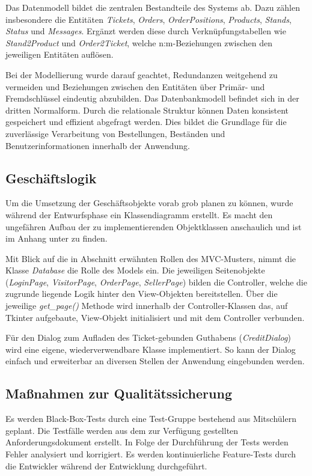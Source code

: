 Das Datenmodell bildet die zentralen Bestandteile des Systems ab. Dazu zählen insbesondere die Entitäten \emph{Tickets}, \emph{Orders}, \emph{OrderPositions},
\emph{Products}, \emph{Stands}, \emph{Status} und \emph{Messages}. Ergänzt werden diese durch Verknüpfungstabellen wie \emph{Stand2Product} und
\emph{Order2Ticket}, welche n:m-Beziehungen zwischen den jeweiligen Entitäten auflösen.

Bei der Modellierung wurde darauf geachtet, Redundanzen weitgehend zu vermeiden und Beziehungen zwischen den Entitäten über Primär- und Fremdschlüssel eindeutig abzubilden. Das
Datenbankmodell befindet sich in der dritten Normalform.  Durch die relationale Struktur können Daten konsistent gespeichert und effizient abgefragt werden. Dies bildet die
Grundlage für die zuverlässige Verarbeitung von Bestellungen, Beständen und Benutzerinformationen innerhalb der Anwendung.

\subsection{Geschäftslogik}
\label{sec:Geschaeftslogik}
Um die Umsetzung der Geschäftsobjekte vorab grob planen zu können, wurde während der Entwurfsphase ein Klassendiagramm erstellt. Es macht den ungefähren Aufbau der zu
implementierenden Objektklassen anschaulich und ist im Anhang unter  zu finden.

Mit Blick auf die in Abschnitt  erwähnten Rollen des \acs{MVC}-Musters, nimmt die Klasse \emph{Database} die Rolle des Models ein. Die jeweiligen
Seitenobjekte (\emph{LoginPage}, \emph{VisitorPage}, \emph{OrderPage}, \emph{SellerPage}) bilden die Controller, welche die zugrunde liegende Logik hinter den View-Objekten 
bereitstellen. Über die jeweilige \emph{get\_page()} Methode wird innerhalb der Controller-Klassen das, auf Tkinter aufgebaute, View-Objekt initialisiert und mit dem Controller
verbunden.

Für den Dialog zum Aufladen des Ticket-gebunden Guthabens (\emph{CreditDialog}) wird eine eigene, wiederverwendbare Klasse implementiert. So kann der Dialog einfach und erweiterbar
an diversen Stellen der Anwendung eingebunden werden.

\subsection{Maßnahmen zur Qualitätssicherung}
\label{sec:Qualitaetssicherung}
Es werden Black-Box-Tests durch eine Test-Gruppe bestehend aus Mitschülern geplant. Die Testfälle werden aus dem zur Verfügung gestellten Anforderungsdokument erstellt. In Folge der
Durchführung der Tests werden Fehler analysiert und korrigiert. Es werden kontinuierliche Feature-Tests durch die Entwickler während der Entwicklung durchgeführt.

